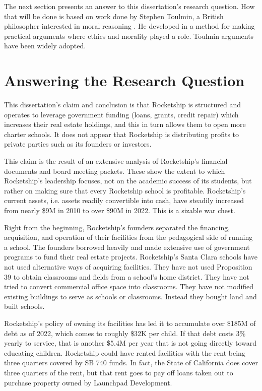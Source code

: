 The next section presents an answer to this dissertation's research question. How that will be done is based on work done by Stephen Toulmin, a British philosopher interested in moral reasoning \parencite{Toulmin2003}. He developed in  a method for making practical arguments where ethics and morality played a role. Toulmin arguments have been widely adopted. %

\section{Answering the Research Question}\label{sec:answ-rese-quest}

This dissertation's claim and conclusion is that Rocketship is structured and operates to leverage government funding (loans, grants, credit repair) which increases their real estate holdings, and this in turn allows them to open more charter schools. It does not appear that Rocketship is distributing profits to private parties such as its founders or investors.\label{p:claim}

This claim is the result of an extensive analysis of Rocketship's financial documents and board meeting packets. These show the extent to which Rocketship's leadership focuses, not on the academic success of its students, but rather on making sure that every Rocketship school is profitable. Rocketship's current assets, i.e. assets readily convertible into cash, have steadily increased from nearly \$9M in 2010 to over \$90M in 2022. This is a sizable war chest.

Right from the beginning, Rocketship's founders separated the financing, acquisition, and operation of their facilities from the pedagogical side of running a school. The founders borrowed heavily and made extensive use of government programs to fund their real estate projects. Rocketship's Santa Clara schools have not used alternative ways of acquiring facilities. They have not used Proposition 39 to obtain classrooms and fields from a school's home district. They have not tried to convert commercial office space into classrooms. They have not modified existing buildings to serve as schools or classrooms. Instead they bought land and built schools.

Rocketship’s policy of owning its facilities has led it to accumulate over \$185M of debt as of 2022, which comes to roughly \$32K per child. If that debt costs 3\% yearly to service, that is another \$5.4M per year that is not going directly toward educating children. Rocketship could have rented facilities with the rent being three quarters covered by SB 740 funds. In fact, the State of California does cover three quarters of the rent, but that rent goes to pay off loans taken out to purchase property owned by Launchpad Development. 

